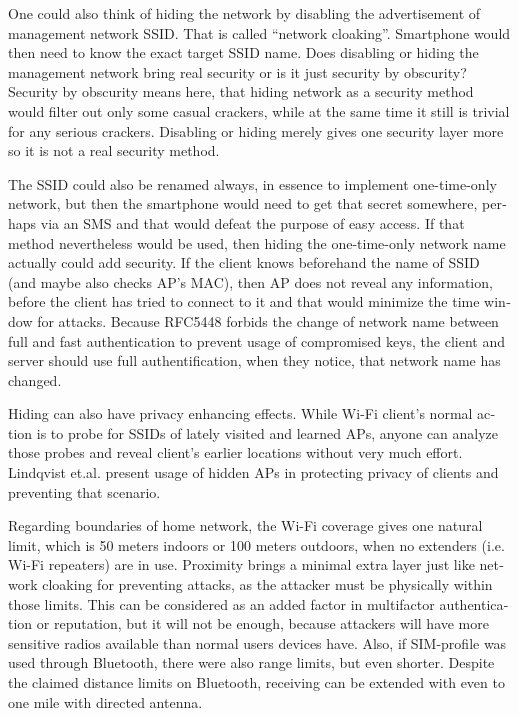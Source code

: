 \documentclass[12pt,a4paper,english]{tutthesis}
\begin{document}
\begin{otherlanguage}{english}
\label{tag:hidessid}
One could also think of hiding the network by disabling the
advertisement of manage\-ment network SSID. That is called ``network
cloaking''.  Smartphone would then need to know the exact target SSID name.
Does disabling or hiding the management network bring real security or
is it just security by obscurity?  Security by obscurity means here,
that hiding network 
as a security method would filter out only some casual crackers, while
at the same time it still is trivial for any serious crackers.
Disabling or hiding  merely gives one security layer more so it is not
a real security method.

The SSID could also be renamed always, in essence to implement
one-time-only network, but then the smartphone would need to get that
secret somewhere, perhaps via an SMS and that would defeat the purpose
of easy access.  If that method nevertheless would be used, then
hiding the one-time-only network name actually could add security. 
If the client knows beforehand the name of SSID
(and maybe also checks AP's MAC), then AP does not reveal any information,
before the client has tried to connect to it and that would minimize
the time window for attacks. 
Because RFC5448\cite[p.12]{rfc5448} forbids the change of network name between full and
fast authentication to prevent usage of compromised keys, the client
and server should use full authentification, when they notice, that
network name has changed.




 Hiding can also have privacy enhancing effects.
While Wi-Fi client's normal action is to probe for SSIDs of lately visited
and learned APs, anyone can analyze those probes and reveal client's
earlier locations without very much effort.
Lindqvist et.al.\cite{hidden-wlan} present usage of hidden
APs in protecting privacy of clients and preventing that scenario.



Regarding boundaries of home network, the Wi-Fi coverage gives 
one natural limit, which is 50 meters indoors or 100 meters outdoors,
when no extenders (i.e. Wi-Fi repeaters) are in use.
Proximity brings a minimal extra layer just like network cloaking 
for preventing attacks, as the attacker must be physically within
those limits.
This can be considered as an added factor in multifactor
authentication or reputation, but it will not be enough, because
attackers will have more sensitive  radios available than normal users
devices have. 
Also, if SIM-profile was used through Bluetooth, there were also
range limits, but even shorter. Despite the claimed distance limits
on Bluetooth, receiving can be extended with even to one mile with
directed antenna\cite{SANS-bluetooth-2007}.





\end{otherlanguage}
\end{document}
